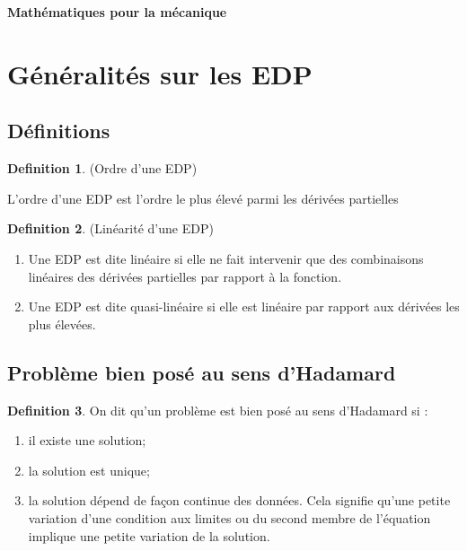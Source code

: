 \documentclass[french]{article}
\theoremstyle{definition}
\newtheorem{definition}{Definition}[section]
\begin{document}
\begin{center}
	\textbf{\Large{Mathématiques pour la mécanique}}
\end{center}

\section{Généralités sur les EDP}
\subsection{Définitions}
\begin{definition}(Ordre d'une EDP)\par
	L'ordre d'une EDP est l'ordre le plus élevé parmi les dérivées partielles
\end{definition}

\begin{definition}(Linéarité d'une EDP)\par
	\begin{enumerate}[label=\textbullet,topsep=5pt,parsep=0pt,itemsep=0pt,before=\vspace{-0.2\baselineskip},after=\vspace{0.1\baselineskip}] 
		\item Une EDP est dite linéaire si elle ne fait intervenir que des combinaisons linéaires des dérivées partielles par rapport à la fonction.
		\item Une EDP est dite quasi-linéaire si elle est linéaire par rapport aux dérivées les plus élevées.
	\end{enumerate}
\end{definition}

\subsection{Problème bien posé au sens d'Hadamard}

\begin{definition}\par
	On dit qu'un problème est bien posé au sens d'Hadamard si :
	\begin{enumerate}[topsep=5pt,parsep=0pt,itemsep=0pt,before=\vspace{-0.2\baselineskip},after=\vspace{0.1\baselineskip}] 
		\item il existe une solution;
		\item la solution est unique;
		\item la solution dépend de façon continue des données. Cela signifie qu'une petite variation d'une condition aux limites ou du second membre de l'équation implique une petite variation de la solution.
	\end{enumerate}
\end{definition}
\end{document}
